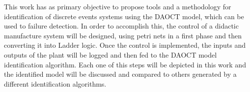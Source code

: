 \begin{foreignabstract}

This work has as primary objective to propose tools and a methodology
for identification of discrete events systems
using the \gls{DAOCT} model, which can be used to failure detection.
In order to accomplish this, the control
of a didactic manufacture system will be designed, using petri nets in
a first phase and then converting it into Ladder logic. Once the control is
implemented, the inputs and outputs of the plant will be logged and then
fed to the \gls{DAOCT} model identification
algorithm. Each one of this steps will be depicted in this work and the identified
model will be discussed and compared to others generated by a different identification algorithms.



\end{foreignabstract}

